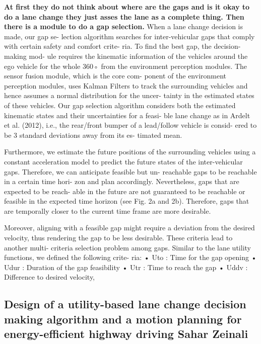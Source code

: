 \documentclass{article}
\begin{document}
\textbf{At first they do not think about where are the gaps and is it okay to do a lane change
they just asses the lane as a complete thing. Then there is a module to do a gap selection. }
When a lane change decision is made, our gap se-
lection algorithm searches for inter-vehicular gaps
that comply with certain safety and comfort crite-
ria. To find the best gap, the decision-making mod-
ule requires the kinematic information of the vehicles
around the ego vehicle for the whole 360◦ from the
environment perception modules.
The sensor fusion module, which is the core com-
ponent of the environment perception modules, uses
Kalman Filters to track the surrounding vehicles and
hence assumes a normal distribution for the uncer-
tainty in the estimated states of these vehicles.
Our gap selection algorithm considers both the estimated
kinematic states and their uncertainties for a feasi-
ble lane change as in Ardelt et al. (2012), i.e., the
rear/front bumper of a lead/follow vehicle is consid-
ered to be 3 standard deviations away from its es-
timated mean.

Furthermore, we estimate the future positions of
the surrounding vehicles using a constant acceleration
model to predict the future states of the inter-vehicular
gaps. Therefore, we can anticipate feasible but un-
reachable gaps to be reachable in a certain time hori-
zon and plan accordingly.
Nevertheless, gaps that are expected to be reach-
able in the future are not guaranteed to be reachable
or feasible in the expected time horizon (see Fig. 2a
and 2b). Therefore, gaps that are temporally closer to
the current time frame are more desirable.

Moreover,
aligning with a feasible gap might require a deviation
from the desired velocity, thus rendering the gap to
be less desirable. These criteria lead to another multi-
criteria selection problem among gaps. Similar to the
lane utility functions, we defined the following crite-
ria:
• Uto : Time for the gap opening
• Udur : Duration of the gap feasibility
• Utr : Time to reach the gap
• Uddv : Difference to desired velocity,



  \subsection{Design of a utility-based lane change decision making algorithm and a
motion planning for energy-efficient highway driving
Sahar Zeinali}
  
\end{document}
